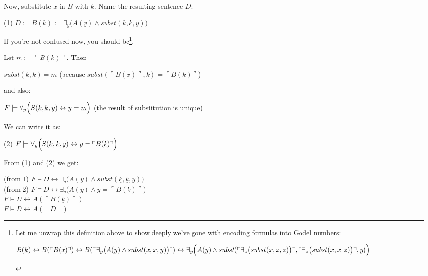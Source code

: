 \documentclass{article}
\begin{document}
Now, substitute $x$ in $B$ with $\underline{k}$. Name the resulting sentence $D$:

\begin{center}
    (1)
    $D := B(\underline{k}) := \exists_y \bigl(
        A(y) \land subst(\underline{k}, \underline{k}, y)
    \bigr)$
\end{center}

If you're not confused now, you should be\footnote{Let me unwrap this definition above
to show deeply we've gone with encoding formulas into Gödel numbers:

    \begin{center}
        $B(\underline{k}) \leftrightarrow
        B(\ulcorner B(x) \urcorner) \leftrightarrow
        B(\ulcorner \exists_y \bigl(
            A(y) \land subst(x, x, y)
        \bigr) \urcorner) \leftrightarrow
        \exists_y \Bigl(
            A(y) \land subst(
                \ulcorner \exists_z \bigl(subst(x, x, z) \bigr) \urcorner,
                \ulcorner \exists_z \bigl(subst(x, x, z) \bigr) \urcorner,
                y)
        \Bigr)
        $
    \end{center}
}.

Let $m := \ulcorner B(\underline{k}) \urcorner$. Then
\begin{center}
    $subst(k, k) = m$ (because $subst(\ulcorner B(x) \urcorner, k) = \ulcorner B(\underline{k}) \urcorner$)
\end{center}

and also:

\begin{center}
    $F \models \forall_y \Bigl( S(\underline{k}, \underline{k}, y) \leftrightarrow y = \underline{m} \Bigl)$
    (the result of substitution is unique)
\end{center}

We can write it as:

\begin{center}
    (2)
    $F \models \forall_y \Bigl( S(\underline{k}, \underline{k}, y) \leftrightarrow y = \ulcorner B(\underline{k}) \urcorner \Bigl)$
\end{center}

From (1) and (2) we get:

\begin{center}
    (from 1) $F \models D \leftrightarrow \exists_y \bigl(
        A(y) \land subst(\underline{k}, \underline{k}, y)
    \bigr)$\\
    (from 2) $F \models D \leftrightarrow \exists_y \bigl(
        A(y) \land y = \ulcorner B(\underline{k}) \urcorner
    \bigr)$\\
    $F \models D \leftrightarrow A(\ulcorner B(\underline{k}) \urcorner)$\\
    $F \models D \leftrightarrow A(\ulcorner D \urcorner)$
\end{center}
\end{document}
